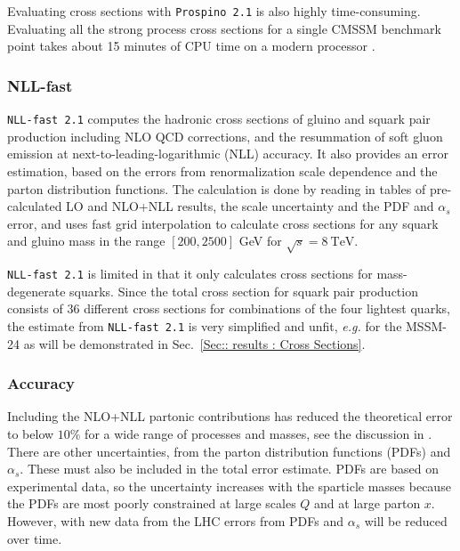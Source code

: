 \documentclass[twoside,english]{uiofysmaster}
\begin{document}
{{Evaluating cross sections with \verb|Prospino 2.1| is also highly time-consuming. Evaluating all the strong process cross sections for a single CMSSM benchmark point takes about 15 minutes of CPU time on a modern processor \cite{Balazs:2017moi}. 


\subsubsection{NLL-fast}

\verb|NLL-fast 2.1| \cite{Beenakker:1996ch, Kulesza:2008jb, Kulesza:2009kq, Beenakker:2009ha, Beenakker:2011fu} computes the hadronic cross sections of gluino and squark pair production including NLO QCD corrections, and the resummation of soft gluon emission at next-to-leading-logarithmic (NLL) accuracy. It also provides an error estimation, based on the errors from renormalization scale dependence and the parton distribution functions. The calculation is done by reading in tables of pre-calculated LO and NLO+NLL results, the scale uncertainty and the PDF and $\alpha_s$ error, and uses fast grid interpolation to calculate cross sections for any squark and gluino mass in the range $[200, 2500]$ GeV for $\sqrt{s}=8~\mathrm{TeV}$. 

\verb|NLL-fast 2.1| is limited in that it only calculates cross sections for mass-degenerate squarks. Since the total cross section for squark pair production consists of 36 different cross sections for combinations of the four lightest quarks, the estimate from \verb|NLL-fast 2.1| is very simplified and unfit, \textit{e.g.} for the MSSM-24 as will be demonstrated in Sec.~\ref{Sec:: results : Cross Sections}.

\subsubsection{Accuracy}

Including the NLO+NLL partonic contributions has reduced the theoretical error to below $10 \%$ for a wide range of processes and masses, see the discussion in \cite{Balazs:2017moi}. There are other uncertainties, from the parton distribution functions (PDFs) and $\alpha_s$. These must also be included in the total error estimate. PDFs are based on experimental data, so the uncertainty increases with the sparticle masses because the PDFs are most poorly constrained at large scales $Q$ and at large parton $x$. However, with new data from the LHC errors from PDFs and $\alpha_s$ will be reduced over time.

}}
\end{document}
